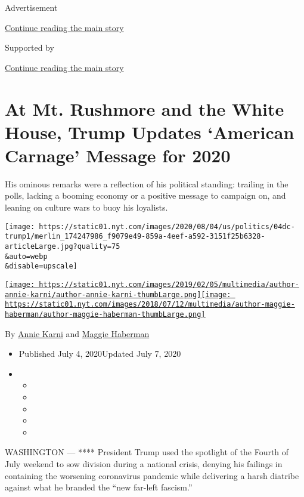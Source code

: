 Advertisement

\protect\hyperlink{after-top}{Continue reading the main story}

Supported by

\protect\hyperlink{after-sponsor}{Continue reading the main story}

\hypertarget{at-mt-rushmore-and-the-white-house-trump-updates-american-carnage-message-for-2020}{%
\section{At Mt. Rushmore and the White House, Trump Updates `American
Carnage' Message for
2020}\label{at-mt-rushmore-and-the-white-house-trump-updates-american-carnage-message-for-2020}}

His ominous remarks were a reflection of his political standing:
trailing in the polls, lacking a booming economy or a positive message
to campaign on, and leaning on culture wars to buoy his loyalists.

\texttt{[image: https://static01.nyt.com/images/2020/08/04/us/politics/04dc-trump1/merlin\_174247986\_f9079e49-859a-4eef-a592-3151f25b6328-articleLarge.jpg?quality=75\\\&auto=webp\\\&disable=upscale]}

\href{https://www.nytimes.com/by/annie-karni}{\texttt{[image: https://static01.nyt.com/images/2019/02/05/multimedia/author-annie-karni/author-annie-karni-thumbLarge.png]}}\href{https://www.nytimes.com/by/maggie-haberman}{\texttt{[image: https://static01.nyt.com/images/2018/07/12/multimedia/author-maggie-haberman/author-maggie-haberman-thumbLarge.png]}}

By \href{https://www.nytimes.com/by/annie-karni}{Annie Karni} and
\href{https://www.nytimes.com/by/maggie-haberman}{Maggie Haberman}

\begin{itemize}
\item
  Published July 4, 2020Updated July 7, 2020
\item
  \begin{itemize}
  \item
  \item
  \item
  \item
  \item
  \end{itemize}
\end{itemize}

WASHINGTON --- **** President Trump used the spotlight of the Fourth of
July weekend to sow division during a national crisis, denying his
failings in containing the worsening coronavirus pandemic while
delivering a harsh diatribe against what he branded the ``new far-left
fascism.''

